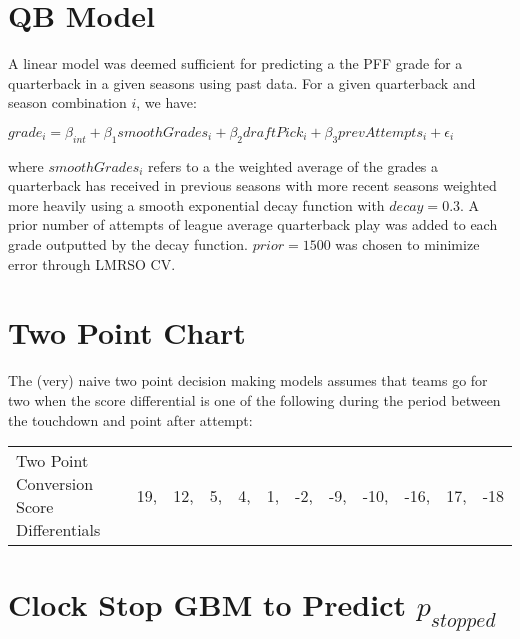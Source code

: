 \documentclass[12pt,twoside]{dukestatscithesis}
\begin{document}
\hypertarget{qb-model}{%
\section{QB Model}\label{qb-model}}

A linear model was deemed sufficient for predicting a the PFF grade for a quarterback in a given seasons using past data. For a given quarterback and season combination \(i\), we have:

\(grade_{i} = \beta_{int} + \beta_{1}smoothGrades_i + \beta_{2}draftPick_i + \beta_{3}prevAttempts_i + \epsilon_i\)

where \(smoothGrades_i\) refers to a the weighted average of the grades a quarterback has received in previous seasons with more recent seasons weighted more heavily using a smooth exponential decay function with \(decay = 0.3\). A prior number of attempts of league average quarterback play was added to each grade outputted by the decay function. \(prior = 1500\) was chosen to minimize error through LMRSO CV.

\hypertarget{two-point-chart}{%
\section{Two Point Chart}\label{two-point-chart}}

The (very) naive two point decision making models assumes that teams go for two when the score differential is one of the following during the period between the touchdown and point after attempt:
\begin{longtable}{llllllllllll}
\toprule
  &  &  &  &  &  &  &  &  &  &  & \\
\midrule
Two Point Conversion Score Differentials & 19, & 12, & 5, & 4, & 1, & -2, & -9, & -10, & -16, & 17, & -18\\
\bottomrule
\end{longtable}
\hypertarget{clock-stop-gbm-to-predict-p_stopped}{%
\section{\texorpdfstring{Clock Stop GBM to Predict \(p_{stopped}\)}{Clock Stop GBM to Predict p\_\{stopped\}}}\label{clock-stop-gbm-to-predict-p_stopped}}
\end{document}
